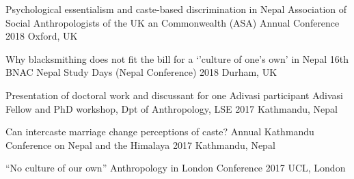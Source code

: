 \begin{cvpresentations}

  \cvpresentation
    {Psychological essentialism and caste-based discrimination in Nepal} %
    {Association of Social Anthropologists of the UK an Commonwealth (ASA) Annual Conference} %
    {2018} %
    {Oxford, UK} %


  \cvpresentation
    {Why blacksmithing does not fit the bill for a `'culture of one's own' in Nepal} %
    {16th BNAC Nepal Study Days (Nepal Conference)} %
    {2018} %
    {Durham, UK} %

\end{cvpresentations}
\begin{cvpresentations}

  \cvpresentation
    {Presentation of doctoral work and discussant for one Adivasi participant} %
    {Adivasi Fellow and PhD workshop, Dpt of Anthropology, LSE} %
    {2017} %
    {Kathmandu, Nepal} %

  \cvpresentation
    {Can intercaste marriage change perceptions of caste?} %
    {Annual Kathmandu Conference on Nepal and the Himalaya} %
    {2017} %
    {Kathmandu, Nepal} %


  \cvpresentation
    {``No culture of our own''} %
    {Anthropology in London Conference} %
    {2017} %
    {UCL, London} %


\end{cvpresentations}
